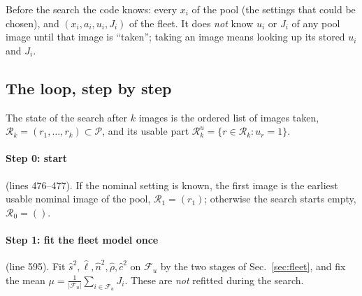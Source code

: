 \documentclass[10pt,a4paper]{article}
\begin{document}
Before the search the code knows: every $x_i$ of the pool (the settings that could be chosen), and $(x_i,a_i,u_i,J_i)$ of the
fleet. It does \emph{not} know $u_i$ or $J_i$ of any pool image until that image is ``taken''; taking an image means looking up
its stored $u_i$ and $J_i$.

\subsection{The loop, step by step}\label{sec:loop}
The state of the search after $k$ images is the ordered list of images taken, $\mathcal R_k=(r_1,\dots,r_k)\subset\mathcal P$, and
its usable part $\mathcal R_k^u=\{r\in\mathcal R_k:u_r=1\}$.

\paragraph{Step 0: start} (lines 476--477). If the nominal setting is known, the first image is the earliest usable nominal image of
the pool, $\mathcal R_1=(r_1)$; otherwise the search starts empty, $\mathcal R_0=()$.

\paragraph{Step 1: fit the fleet model once} (line 595). Fit $\hat s^2,\hat\ell,\hat n^2,\hat\rho,\hat c^2$ on $\mathcal F_u$ by the two
stages of Sec.~\ref{sec:fleet}, and fix the mean $\mu=\frac1{|\mathcal F_u|}\sum_{i\in\mathcal F_u}J_i$. These are \emph{not}
refitted during the search.
\end{document}
